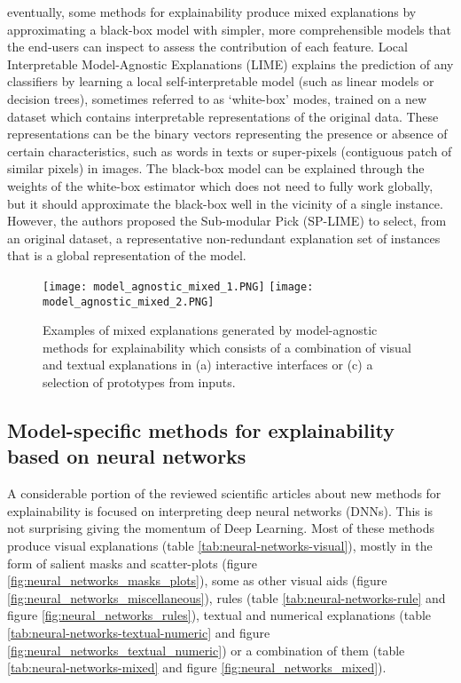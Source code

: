 \documentclass[final,1p,times]{elsarticle}
\begin{document}
eventually, some methods for explainability produce mixed explanations by approximating a black-box model with simpler, more comprehensible models that the end-users can inspect to assess the contribution of each feature. Local Interpretable Model-Agnostic Explanations (LIME) \cite{ribeiro2016model,ribeiro2016should} explains the prediction of any classifiers by learning a local self-interpretable model (such as linear models or decision trees), sometimes referred to as `white-box' modes, trained on a new dataset which contains interpretable representations of the original data. These representations can be the binary vectors representing the presence or absence of certain characteristics, such as words in texts or super-pixels (contiguous patch of similar pixels) in images. The black-box model can be explained through the weights of the white-box estimator which does not need to fully work globally, but it should approximate the black-box well in the vicinity of a single instance. However, the authors proposed the Sub-modular Pick (SP-LIME) to select, from an original dataset, a representative non-redundant explanation set of instances that is a global representation of the model.


\begin{figure}[!ht]
\begin{minipage}{\textwidth}
\centering
    {\texttt{[image: model\_agnostic\_mixed\_1.PNG]}}
    {\texttt{[image: model\_agnostic\_mixed\_2.PNG]}}
  \caption{Examples of mixed explanations generated by model-agnostic methods for explainability which consists of a combination of visual and textual explanations in (a) interactive interfaces or (c) a selection of prototypes from  inputs.}
  \label{fig:model_agnostic_mixed}
\end{minipage}
\end{figure}


\subsection{Model-specific methods for explainability based on neural networks}
A considerable portion of the reviewed scientific articles about new methods for explainability is focused on interpreting deep neural networks (DNNs). This is not surprising giving the momentum of Deep Learning. Most of these methods produce visual explanations (table \ref{tab:neural-networks-visual}), mostly in the form of salient masks and scatter-plots (figure \ref{fig:neural_networks_masks_plots}), some as other visual aids (figure \ref{fig:neural_networks_miscellaneous}), rules (table \ref{tab:neural-networks-rule} and figure \ref{fig:neural_networks_rules}), textual and numerical explanations (table \ref{tab:neural-networks-textual-numeric} and figure \ref{fig:neural_networks_textual_numeric}) or a combination of them (table \ref{tab:neural-networks-mixed} and figure \ref{fig:neural_networks_mixed}).
\end{document}
